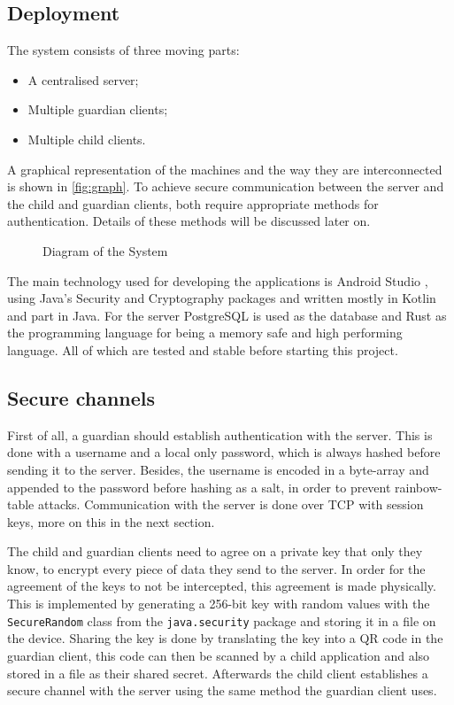 \documentclass[a4paper]{article}
\begin{document}
\subsection{Deployment}
The system consists of three moving parts:
\begin{itemize}
    \item A centralised server;
    \item Multiple guardian clients;
    \item Multiple child clients.
\end{itemize}
A graphical representation of the machines and the way they are interconnected is shown in \autoref{fig:graph}. To achieve secure communication between the server and the child and guardian clients, both require appropriate methods for authentication. Details of these methods will be discussed later on.

\begin{figure}[ht!]
    \centering
    
    \caption{Diagram of the System}\label{fig:graph}
\end{figure}

The main technology used for developing the applications is Android Studio \cite{android_studio}, using Java's Security \cite{java_security} and Cryptography \cite{javax_crypto} packages and written mostly in Kotlin \cite{kotlin} and part in Java. For the server PostgreSQL \cite{postgres} is used as the database and Rust \cite{rust} as the programming language for being a memory safe and high performing language. All of which are tested and stable before starting this project.

\subsection{Secure channels}
First of all, a guardian should establish authentication with the server. This is done with a username and a local only password, which is always hashed before sending it to the server. Besides, the username is encoded in a byte-array and appended to the password before hashing as a salt, in order to prevent rainbow-table attacks. Communication with the server is done over TCP with session keys, more on this in the next section.

The child and guardian clients need to agree on a private key that only they know, to encrypt every piece of data they send to the server. In order for the agreement of the keys to not be intercepted, this agreement is made physically. This is implemented by generating a 256-bit key with random values with the \texttt{SecureRandom} class \cite{secure_random} from the \texttt{java.security} package and storing it in a file on the device. Sharing the key is done by translating the key into a QR code in the guardian client, this code can then be scanned by a child application and also stored in a file as their shared secret. Afterwards the child client establishes a secure channel with the server using the same method the guardian client uses.
\end{document}
